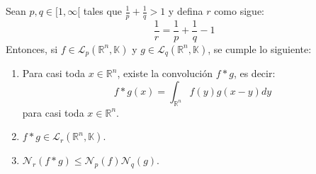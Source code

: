 \documentclass[12pt]{report}
\theoremstyle{largebreak}
\newcommand{\N}[2]{\ensuremath{\mathcal{N}_{#1}\left(#2\right)}}
\begin{document}
    \begin{theor}
        Sean $p,q\in [1,\infty[$ tales que $\frac{1}{p}+\frac{1}{q}>1$ y defina $r$ como sigue:
        \begin{equation*}
            \frac{1}{r}=\frac{1}{p}+\frac{1}{q}-1
        \end{equation*}
        Entonces, si $f\in\mathcal{L}_p(\mathbb{R}^n,\mathbb{K})$ y $g\in\mathcal{L}_q(\mathbb{R}^n,\mathbb{K})$, se cumple lo siguiente:
        \begin{enumerate}
            \item Para casi toda $x\in\mathbb{R}^n$, existe la convolución $f*g$, es decir:
            \begin{equation*}
                f*g(x)=\int_{\mathbb{R}^n}f(y)g(x-y)dy
            \end{equation*}
            para casi toda $x\in\mathbb{R}^n$.
            \item $f*g\in\mathcal{L}_r(\mathbb{R}^n,\mathbb{K})$.
            \item $\N{r}{f*g}\leq \N{p}{f}\N{q}{g}$.
        \end{enumerate}
    \end{theor}
\end{document}

